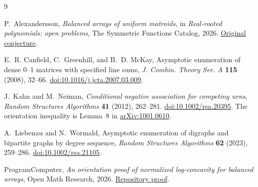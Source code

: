 \documentclass[11pt]{article}
\begin{document}
\begin{thebibliography}{9}
\raggedright
{}
P.~Alexandersson,
\emph{Balanced arrays of uniform matroids},
in \emph{Real-rooted polynomials: open problems},
The Symmetric Functions Catalog, 2026.
\href{https://www.symmetricfunctions.com/realRootedOpenProblems.htm\#conjBalancedArrays}
{Original conjecture}.

E.~R. Canfield, C.~Greenhill, and B.~D. McKay,
Asymptotic enumeration of dense $0$--$1$ matrices with specified line sums,
\emph{J. Combin. Theory Ser. A} \textbf{115} (2008), 32--66.
\href{https://doi.org/10.1016/j.jcta.2007.03.009}
{doi:10.1016/j.jcta.2007.03.009}.

J.~Kahn and M.~Neiman,
\emph{Conditional negative association for competing urns},
\emph{Random Structures Algorithms} \textbf{41} (2012), 262--281.
\href{https://doi.org/10.1002/rsa.20395}{doi:10.1002/rsa.20395}.
The orientation inequality is Lemma~8 in
\href{https://arxiv.org/abs/1001.0610}{arXiv:1001.0610}.

A.~Liebenau and N.~Wormald,
Asymptotic enumeration of digraphs and bipartite graphs by degree sequence,
\emph{Random Structures Algorithms} \textbf{62} (2023), 259--286.
\href{https://doi.org/10.1002/rsa.21105}{doi:10.1002/rsa.21105}.

ProgramComputer,
\emph{An orientation proof of normalized log-concavity for balanced arrays},
Open Math Research, 2026.
\href{https://github.com/ProgramComputer/open-math-research/blob/research/topics/balanced-arrays/orientation-normalization.md}
{Repository proof}.
\end{thebibliography}
\end{document}

